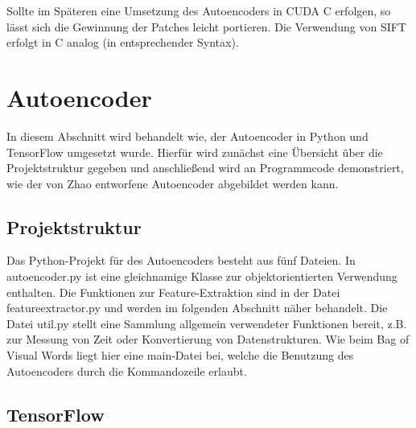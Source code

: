 Sollte im Späteren eine Umsetzung des Autoencoders in CUDA C erfolgen, so lässt sich die Gewinnung der Patches leicht portieren. Die Verwendung von SIFT erfolgt in C analog (in entsprechender Syntax).

\section{Autoencoder}

In diesem Abschnitt wird behandelt wie, der Autoencoder in Python und TensorFlow umgesetzt wurde. Hierfür wird zunächst eine Übersicht über die Projektstruktur gegeben und anschließend wird an Programmcode demonstriert, wie der von Zhao entworfene Autoencoder abgebildet werden kann.

\subsection{Projektstruktur} Das Python-Projekt für des Autoencoders besteht aus fünf Dateien. In autoencoder.py ist eine gleichnamige Klasse zur objektorientierten Verwendung enthalten. Die Funktionen zur Feature-Extraktion sind in der Datei feature\textunderscore extractor.py und werden im folgenden Abschnitt näher behandelt. Die Datei util.py stellt eine Sammlung allgemein verwendeter Funktionen bereit, z.B. zur Messung von Zeit oder Konvertierung von Datenstrukturen. Wie beim Bag of Visual Words liegt hier eine main-Datei bei, welche die Benutzung des Autoencoders durch die Kommandozeile erlaubt.


\subsection{TensorFlow}

